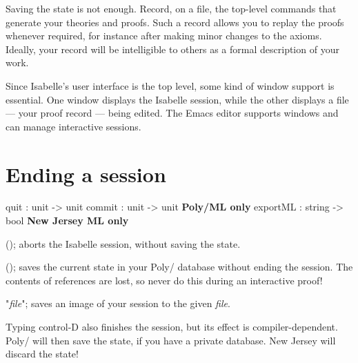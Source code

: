 Saving the state is not enough.  Record, on a file, the top-level commands
that generate your theories and proofs.  Such a record allows you to replay
the proofs whenever required, for instance after making minor changes to
the axioms.  Ideally, your record will be intelligible to others as a
formal description of your work.

Since Isabelle's user interface is the \ML{} top level, some kind of window
support is essential.  One window displays the Isabelle session, while the
other displays a file --- your proof record --- being edited.  The Emacs
editor supports windows and can manage interactive sessions.


\section{Ending a session}
\begin{ttbox} 
quit     : unit -> unit
commit   : unit -> unit \hfill{\bf Poly/ML only}
exportML : string -> bool \hfill{\bf New Jersey ML only}
\end{ttbox}
\begin{ttdescription}
\item[\ttindexbold{quit}();]  
aborts the Isabelle session, without saving the state.

\item[\ttindexbold{commit}();] 
  saves the current state in your Poly/\ML{} database without ending the
  session.  The contents of references are lost, so never do this during an
  interactive proof!

\item[\ttindexbold{exportML} "{\it file}";]  saves an
image of your session to the given {\it file}.
\end{ttdescription}

\begin{warn}
Typing control-D also finishes the session, but its effect is
compiler-dependent.  Poly/\ML{} will then save the state, if you have a
private database.  New Jersey \ML{} will discard the state!
\end{warn}


